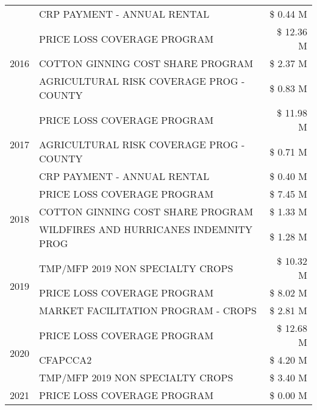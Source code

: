 \begin{tabular}{llr}
 & CRP PAYMENT - ANNUAL RENTAL & \$ 0.44 M \\
\cline{1-3}
\multirow[t]{3}{*}{2016} & PRICE LOSS COVERAGE PROGRAM                   & \$ 12.36 M \\
 & COTTON GINNING COST SHARE PROGRAM             & \$ 2.37 M \\
 & AGRICULTURAL RISK COVERAGE PROG - COUNTY      & \$ 0.83 M \\
\cline{1-3}
\multirow[t]{3}{*}{2017} & PRICE LOSS COVERAGE PROGRAM & \$ 11.98 M \\
 & AGRICULTURAL RISK COVERAGE PROG - COUNTY & \$ 0.71 M \\
 & CRP PAYMENT - ANNUAL RENTAL & \$ 0.40 M \\
\cline{1-3}
\multirow[t]{3}{*}{2018} & PRICE LOSS COVERAGE PROGRAM & \$ 7.45 M \\
 & COTTON GINNING COST SHARE PROGRAM & \$ 1.33 M \\
 & WILDFIRES AND HURRICANES INDEMNITY PROG & \$ 1.28 M \\
\cline{1-3}
\multirow[t]{3}{*}{2019} & TMP/MFP 2019 NON SPECIALTY CROPS & \$ 10.32 M \\
 & PRICE LOSS COVERAGE PROGRAM & \$ 8.02 M \\
 & MARKET FACILITATION PROGRAM - CROPS & \$ 2.81 M \\
\cline{1-3}
\multirow[t]{3}{*}{2020} & PRICE LOSS COVERAGE PROGRAM & \$ 12.68 M \\
 & CFAPCCA2 & \$ 4.20 M \\
 & TMP/MFP 2019 NON SPECIALTY CROPS & \$ 3.40 M \\
\cline{1-3}
2021 & PRICE LOSS COVERAGE PROGRAM & \$ 0.00 M \\
\cline{1-3}
\bottomrule
\end{tabular}
